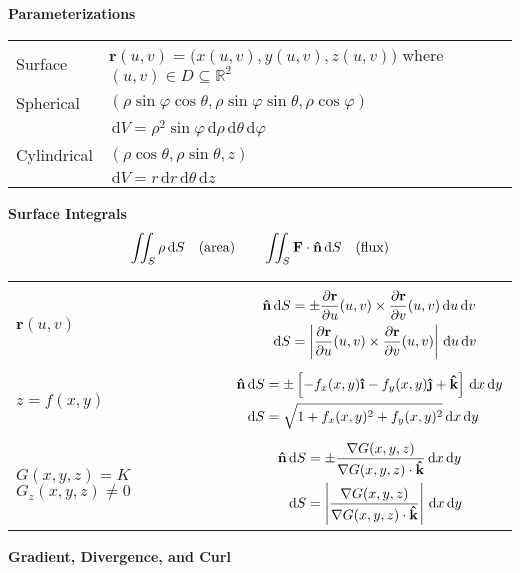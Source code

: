 \documentclass[10pt]{article}
\newcommand\heading[1]{\smallskip\textbf{#1}\smallskip}
\newcommand{\R}{{\mathbb R}}
\renewcommand{\phi}{\varphi}
\newcommand{\norm}[1]{\left|#1\right|}
\newcommand{\bv}[1]{\mathbf{#1}}                                %
\newcommand{\uv}[1]{{\bm{\hat{\textnormal{\bfseries #1}}}}}     %
\newcommand{\ihat}{\uv{\i}}
\newcommand{\jhat}{\uv{\j}}
\newcommand{\khat}{\uv{k}}
\newcommand{\F}{\bv F}
\newcommand{\n}{\uv n}
\renewcommand{\r}{\bv r}
\renewcommand{\d}{\,\mathrm{d}}
\newcommand{\pd}[2]{\frac{\partial #1}{\partial #2}}
\newcommand{\grad}{\nabla}
\begin{document}
\begin{multicols*}{2}
\heading{Parameterizations}

{\tabulinesep=3pt
\begin{tabu}{@{}ll}
    Surface     & $\bv r(u,v)=\bigl(x(u,v),y(u,v),z(u,v)\bigr)$ where $(u,v)\in D\subseteq\R^2$ \\
    Spherical   & $(\rho\sin\phi\cos\theta,\rho\sin\phi\sin\theta,\rho\cos\phi)$ \\
                & $\d V=\rho^2\sin\phi\d\rho\d\theta\d\phi$ \\
    Cylindrical & $(\rho\cos\theta,\rho\sin\theta,z)$ \\
                & $\d V=r\d r\d \theta\d z$
\end{tabu}}

\heading{Surface Integrals}
\[\iint_S\rho\d S\quad\text{(area)}\qquad\iint_S\F\cdot\n\d S\quad\text{(flux)}\]


\begin{tabular}{p{100pt}c}
    \hline\\
    $\r(u,v)$ & $\begin{aligned}
                    \n\d S&=\pm\pd\r u(u,v)\times\pd\r v(u,v)\d u\d v \\
                    \d S&=\norm{\pd\r u(u,v)\times\pd\r v(u,v)}\d u\d v
                \end{aligned}$ \\[25pt]
    \hline\\
    $z=f(x,y)$ & $\begin{aligned}
                    \n\d S&=\pm\left[-f_x(x,y)\ihat-f_y(x,y)\jhat+\khat\right]\d x\d y \\
                    \d S&=\sqrt{1+f_x(x,y)^2+f_y(x,y)^2}\d x\d y
                \end{aligned}$ \\[25pt]
    \hline\\
    $G(x,y,z)=K$\newline$G_z(x,y,z)\ne 0$ & $\begin{aligned}
                                                \n\d S&=\pm\frac{\grad G(x,y,z)}{\grad G(x,y,z)\cdot\khat}\d x\d y \\
                                                \d S&=\norm{\frac{\grad G(x,y,z)}{\grad G(x,y,z)\cdot\khat}}\d x\d y
                                            \end{aligned}$ \\[33pt]
    \hline
\end{tabular}


\newpage 
\heading{Gradient, Divergence, and Curl}


\end{multicols*}
\end{document}
